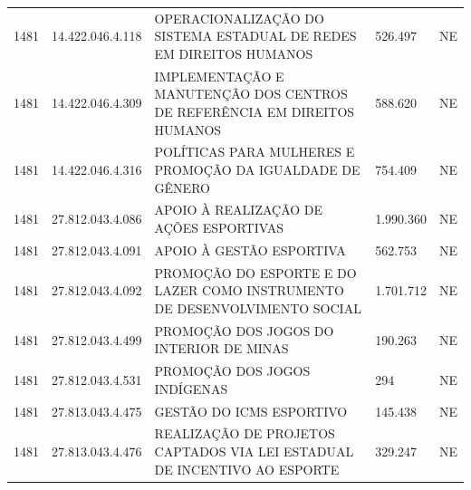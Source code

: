 \documentclass{article}
\begin{document}
\begin{longtable}[c]{m{1cm}|m{2cm}|m{10cm}|m{2cm}|m{1cm}}
\multicolumn{1}{C{1cm}|}{1481} & \multicolumn{1}{C{2cm}|}{14.422.046.4.118} & \multicolumn{1}{L{10cm}|}{OPERACIONALIZAÇÃO DO SISTEMA ESTADUAL DE REDES EM DIREITOS HUMANOS} & \multicolumn{1}{R{2cm}|}{526.497} & \multicolumn{1}{C{1cm}}{NE} \\
\multicolumn{1}{C{1cm}|}{1481} & \multicolumn{1}{C{2cm}|}{14.422.046.4.309} & \multicolumn{1}{L{10cm}|}{IMPLEMENTAÇÃO E MANUTENÇÃO DOS CENTROS DE REFERÊNCIA EM DIREITOS HUMANOS} & \multicolumn{1}{R{2cm}|}{588.620} & \multicolumn{1}{C{1cm}}{NE} \\
\multicolumn{1}{C{1cm}|}{1481} & \multicolumn{1}{C{2cm}|}{14.422.046.4.316} & \multicolumn{1}{L{10cm}|}{POLÍTICAS PARA MULHERES E PROMOÇÃO DA IGUALDADE DE GÊNERO} & \multicolumn{1}{R{2cm}|}{754.409} & \multicolumn{1}{C{1cm}}{NE} \\
\multicolumn{1}{C{1cm}|}{1481} & \multicolumn{1}{C{2cm}|}{27.812.043.4.086} & \multicolumn{1}{L{10cm}|}{APOIO À REALIZAÇÃO DE AÇÕES ESPORTIVAS} & \multicolumn{1}{R{2cm}|}{1.990.360} & \multicolumn{1}{C{1cm}}{NE} \\
\multicolumn{1}{C{1cm}|}{1481} & \multicolumn{1}{C{2cm}|}{27.812.043.4.091} & \multicolumn{1}{L{10cm}|}{APOIO À GESTÃO ESPORTIVA} & \multicolumn{1}{R{2cm}|}{562.753} & \multicolumn{1}{C{1cm}}{NE} \\
\multicolumn{1}{C{1cm}|}{1481} & \multicolumn{1}{C{2cm}|}{27.812.043.4.092} & \multicolumn{1}{L{10cm}|}{PROMOÇÃO DO ESPORTE E DO LAZER COMO INSTRUMENTO DE DESENVOLVIMENTO SOCIAL} & \multicolumn{1}{R{2cm}|}{1.701.712} & \multicolumn{1}{C{1cm}}{NE} \\
\multicolumn{1}{C{1cm}|}{1481} & \multicolumn{1}{C{2cm}|}{27.812.043.4.499} & \multicolumn{1}{L{10cm}|}{PROMOÇÃO DOS JOGOS DO INTERIOR DE MINAS} & \multicolumn{1}{R{2cm}|}{190.263} & \multicolumn{1}{C{1cm}}{NE} \\
\multicolumn{1}{C{1cm}|}{1481} & \multicolumn{1}{C{2cm}|}{27.812.043.4.531} & \multicolumn{1}{L{10cm}|}{PROMOÇÃO DOS JOGOS INDÍGENAS} & \multicolumn{1}{R{2cm}|}{294} & \multicolumn{1}{C{1cm}}{NE} \\
\multicolumn{1}{C{1cm}|}{1481} & \multicolumn{1}{C{2cm}|}{27.813.043.4.475} & \multicolumn{1}{L{10cm}|}{GESTÃO DO ICMS ESPORTIVO} & \multicolumn{1}{R{2cm}|}{145.438} & \multicolumn{1}{C{1cm}}{NE} \\
\multicolumn{1}{C{1cm}|}{1481} & \multicolumn{1}{C{2cm}|}{27.813.043.4.476} & \multicolumn{1}{L{10cm}|}{REALIZAÇÃO DE PROJETOS CAPTADOS VIA LEI ESTADUAL DE INCENTIVO AO ESPORTE} & \multicolumn{1}{R{2cm}|}{329.247} & \multicolumn{1}{C{1cm}}{NE} \\

\end{longtable}
\end{document}
